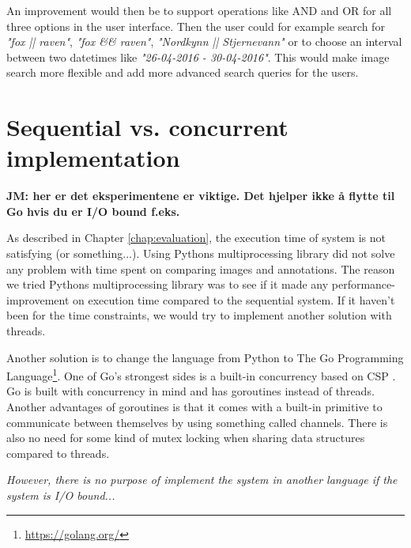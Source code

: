 \documentclass[USenglish]{uit-thesis}
\begin{document}
An improvement would then be to support operations like AND and OR for all three options in the user interface.
Then the user could for example search for \textit{"fox || raven"}, \textit{"fox \&\& raven"}, \textit{"Nordkynn || Stjernevann"} or to choose an interval between two datetimes like \textit{"26-04-2016 - 30-04-2016"}. This would make image search more flexible and add more advanced search queries for the users.

\section{Sequential vs. concurrent implementation}
\textbf{JM: her er det eksperimentene er viktige. Det hjelper ikke å flytte til Go hvis du er I/O bound f.eks.}

As described in Chapter \ref{chap:evaluation}, the execution time of system is not satisfying (or something...). Using Pythons multiprocessing library did not solve any problem with time spent on comparing images and annotations. The reason we tried Pythons multiprocessing library was to see if it made any performance-improvement on execution time compared to the sequential system. If it haven't been for the time constraints, we would try to implement another solution with threads.

Another solution is to change the language from Python to The Go Programming Language\footnote{\url{https://golang.org/}}. One of Go's strongest sides is a built-in concurrency based on CSP \cite{hoare}. Go is built with concurrency in mind and has goroutines instead of threads. Another advantages of goroutines is that it comes with a built-in primitive to communicate between themselves by using something called channels. There is also no need for some kind of mutex locking when sharing data structures compared to threads.

\textit{However, there is no purpose of implement the system in another language if the system is I/O bound...}

\end{document}
